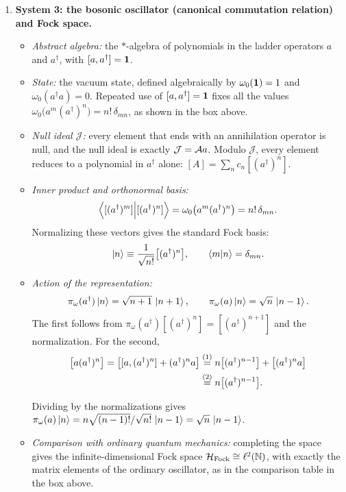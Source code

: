 \begin{workedexamplebox}
\begin{enumerate}[leftmargin=*]
\item \textbf{System 3: the bosonic oscillator (canonical commutation relation) and Fock space.}
\begin{itemize}[leftmargin=*]
\item \emph{Abstract algebra:} the $*$-algebra of polynomials in the ladder operators $a$ and $a^\dagger$,
with $[a, a^\dagger] = \mathbf{1}$.
\item \emph{State:} the vacuum state, defined algebraically by $\omega_0(\mathbf{1}) = 1$ and
$\omega_0(a^\dagger a) = 0$. Repeated use of $[a, a^\dagger] = \mathbf{1}$ fixes all the values
$\omega_0\big(a^m (a^\dagger)^n\big) = n!\,\delta_{mn}$, as shown in the box above.
\item \emph{Null ideal $\mathcal{J}$:} every element that ends with an annihilation operator is null, and the
null ideal is exactly $\mathcal{J} = \mathcal{A} a$. Modulo $\mathcal{J}$, every element reduces to a polynomial in
$a^\dagger$ alone: $[A] = \sum_n c_n [(a^\dagger)^n]$.
\item \emph{Inner product and orthonormal basis:}
\[
\Braket{[(a^\dagger)^m] \Big| [(a^\dagger)^n]} = \omega_0\big(a^m (a^\dagger)^n\big) = n!\,\delta_{mn} .
\]
Normalizing these vectors gives the standard Fock basis:
\[
\ket{n} \equiv \frac{1}{\sqrt{n!}}\big[(a^\dagger)^n\big], \qquad \braket{m|n} = \delta_{mn} .
\]
\item \emph{Action of the representation:}
\[
\pi_\omega(a^\dagger)\ket{n} = \sqrt{n+1}\,\ket{n+1}, \qquad \pi_\omega(a)\ket{n} = \sqrt{n}\,\ket{n-1} .
\]
The first follows from $\pi_\omega(a^\dagger)[(a^\dagger)^n]=[(a^\dagger)^{n+1}]$ and the normalization. For
the second,
\begin{align}
\big[a(a^\dagger)^n\big] = \big[[a,(a^\dagger)^n] + (a^\dagger)^n a\big]
&\overset{(1)}{=} n\big[(a^\dagger)^{n-1}\big] + \big[(a^\dagger)^n a\big] \notag\\
&\overset{(2)}{=} n\big[(a^\dagger)^{n-1}\big] . \notag
\end{align}
\quad
{}

Dividing by the normalizations gives $\pi_\omega(a)\ket n=n\sqrt{(n-1)!}/\sqrt{n!}\,\ket{n-1}=
\sqrt n\,\ket{n-1}$.
\item \emph{Comparison with ordinary quantum mechanics:} completing the space gives the infinite-dimensional
Fock space $\mathcal{H}_{\text{Fock}} \cong \ell^2(\mathbb{N})$, with exactly the matrix elements of the ordinary
oscillator, as in the comparison table in the box above.
\end{itemize}
\end{enumerate}
\end{workedexamplebox}

